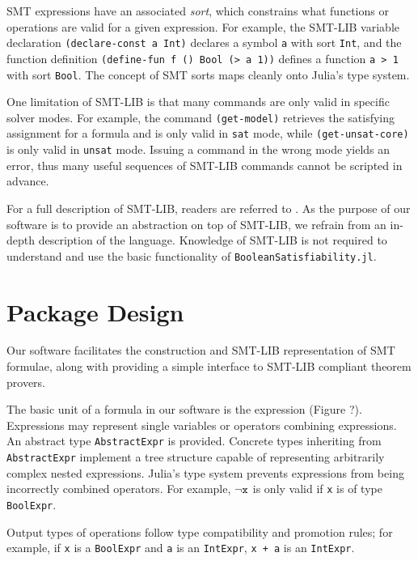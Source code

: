 \documentclass[conference]{IEEEtran}
\begin{document}
SMT expressions have an associated \textit{sort}, which constrains what functions or operations are valid for a given expression. For example, the SMT-LIB variable declaration \verb|(declare-const a Int)| declares a symbol \verb|a| with sort \verb|Int|, and the function definition \verb|(define-fun f () Bool (> a 1))| defines a function \verb|a > 1| with sort \verb|Bool|. The concept of SMT sorts maps cleanly onto Julia's type system.


One limitation of SMT-LIB is that many commands are only valid in specific solver modes.
For example, the command \verb|(get-model)| retrieves the satisfying assignment for a formula and is only valid in \verb|sat| mode, while \verb|(get-unsat-core)| is only valid in \verb|unsat| mode. Issuing a command in the wrong mode yields an error, thus many useful sequences of SMT-LIB commands cannot be scripted in advance.

For a full description of SMT-LIB, readers are referred to \cite{smtlib2}. As the purpose of our software is to provide an abstraction on top of SMT-LIB, we refrain from an in-depth description of the language. Knowledge of SMT-LIB is not required to understand and use the basic functionality of \verb|BooleanSatisfiability.jl|.

\section{Package Design}
Our software facilitates the construction and SMT-LIB representation of SMT formulae, along with providing a simple interface to SMT-LIB compliant theorem provers.

The basic unit of a formula in our software is the expression (Figure ?). %
Expressions may represent single variables or operators combining expressions. An abstract type \verb|AbstractExpr| is provided. Concrete types inheriting from \verb|AbstractExpr| implement a tree structure capable of representing arbitrarily complex nested expressions. Julia's type system prevents expressions from being incorrectly combined operators. For example, $\neg\verb|x|$ is only valid if \verb|x| is of type \verb|BoolExpr|.

Output types of operations follow type compatibility and promotion rules; for example, if \verb|x| is a \verb|BoolExpr| and \verb|a| is an \verb|IntExpr|, \verb|x + a| is an \verb|IntExpr|.
\end{document}
